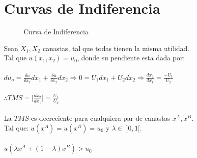 \documentclass{article}
\begin{document}
\section{Curvas de Indiferencia}
\begin{figure} [H]
    \centering
    
    \caption{Curva de Indiferencia}
    \label{fig:placeholder}
\end{figure}

Sean $X_1,X_2$ canastas, tal que todas tienen la misma utilidad. \\
Tal que $u(x_1,x_2)=u_0$, donde su pendiente esta dada por: \\\\
$du_o=\frac{\delta u}{\delta x_1}dx_1+\frac{\delta u}{\delta x_2}dx_2\Rightarrow 0=U_1dx_1+U_2dx_2\Rightarrow \frac{dx_2}{dx_1}=\frac{-U_1}{U_2}$\\\\ $\therefore TMS= \lvert\frac{dx_2}{dx_1}\rvert=\frac{U_1}{U_2}$\\\\
\newpage
La $TMS$ es decreciente para cualquiera par de canastas $x^A,x^B$.\\
Tal que: $u(x^A)=u(x^B)=u_0$ y $\lambda\in\;]0,1[$.\\\\
$u(\lambda x^A + (1-\lambda)x^B)>u_0$
\begin{figure} [H]
    
    \label{fig:placeholder}
\end{figure}
\end{document}
